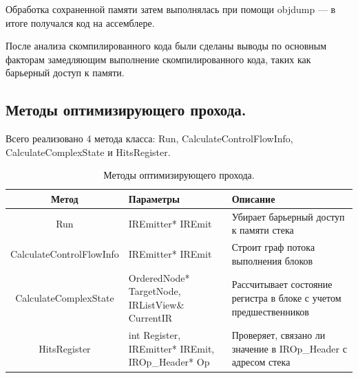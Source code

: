 Обработка сохраненной памяти затем выполнялась при помощи objdump \cite{objdump} --- в итоге получался код на ассемблере.

После анализа скомпилированного кода были сделаны выводы по основным факторам замедляющим выполнение скомпилированного кода, таких как барьерный доступ к памяти.

\subsection{Методы оптимизирующего прохода.}

Всего реализовано 4 метода класса: Run, CalculateControlFlowInfo, \\ CalculateComplexState и HitsRegister.

\begin{table}[!htb]
	\label{table:benches}
	\begin{center}
		\caption{Методы оптимизирующего прохода.}
		\begin{tabular}{|c|p{4.5cm}|p{5.5cm}|}
			\hline
			\bfseries Метод & \bfseries Параметры & \bfseries Описание \\
			\hline
			Run & IREmitter* IREmit & Убирает барьерный доступ к памяти стека \\ \hline
			CalculateControlFlowInfo & IREmitter* IREmit & Строит граф потока выполнения блоков \\ \hline
			CalculateComplexState & OrderedNode* TargetNode,
			IRListView\& CurrentIR & Рассчитывает состояние регистра в блоке с учетом предшественников \\ \hline
			HitsRegister & int Register, IREmitter* IREmit,
			IROp\_Header* Op & Проверяет, связано ли значение в IROp\_Header с адресом стека \\ \hline
		\end{tabular}
	\end{center}
\end{table}


